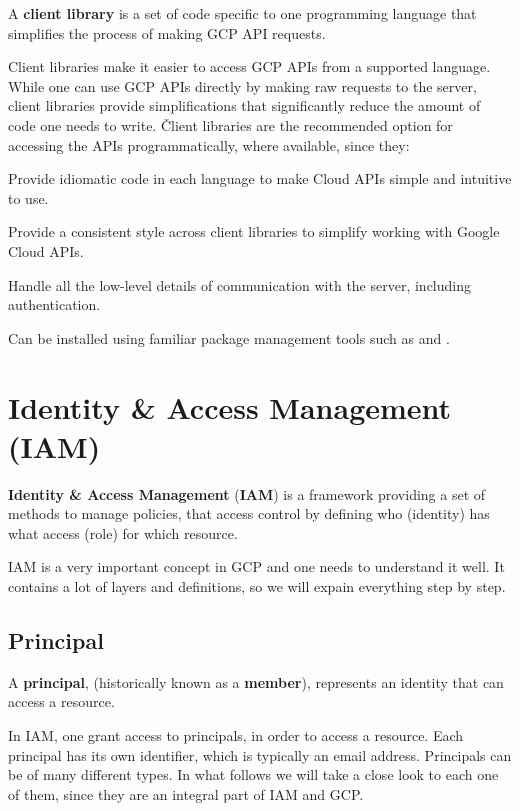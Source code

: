 A \textbf{client library} is a set of code specific to one programming language that simplifies the process of making
GCP API requests.
\ed

Client libraries make it easier to access GCP APIs from a supported language. While one can use GCP APIs directly by
making raw requests to the server, client libraries provide simplifications that significantly reduce the amount of
code one needs to write. \v

Client libraries are the recommended option for accessing the APIs programmatically, where available, since they:
\bit
\item Provide idiomatic code in each language to make Cloud APIs simple and intuitive to use.
\item Provide a consistent style across client libraries to simplify working with Google Cloud APIs.
\item Handle all the low-level details of communication with the server, including authentication.
\item Can be installed using familiar package management tools such as  and .
\eit

\section{Identity \& Access Management (IAM)}

\textbf{Identity \& Access Management} (\textbf{IAM}) is a framework providing a set of methods to manage policies,
that access control by defining who (identity) has what access (role) for which resource.
\ed

IAM is a very important concept in GCP and one needs to understand it well. It contains a lot of layers and definitions,
so we will expain everything step by step.

\subsection{Principal}

\bd[Principal]
A \textbf{principal}, (historically known as a \textbf{member}), represents an identity that can access a resource.
\ed

In IAM, one grant access to principals, in order to access a resource. Each principal has its own identifier, which is
typically an email address. Principals can be of many different types. In what follows we will take a close look to
each one of them, since they are an integral part of IAM and GCP\@.

